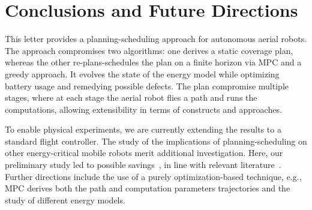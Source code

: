 \documentclass[letterpaper,10pt,journal,twoside]{IEEEtran}
\newcommand{\stt}[1]{{\small\tt #1}} %
\newcommand{\powprof}{\stt{powprofiler}}
\theoremstyle{definition}
\begin{document}



\vspace*{-1.5ex}
\section{Conclusions and Future Directions}  %
\label{sec:conclusion}                       %
This letter provides a planning-scheduling approach for autonomous aerial robots.%
The approach compromises two algorithms: one derives a static coverage plan, whereas the other re-plans-schedules the plan on a finite horizon via MPC {\color{blue} and a greedy approach}. It evolves the state of the energy model while optimizing battery usage and remedying possible defects. The plan compromise multiple stages, where at each stage the aerial robot flies a path and runs the computations, allowing %
extensibility in terms of constructs and approaches.

{\color{blue}To enable physical experiments}, we are currently extending the results to a standard flight controller. %
The study of the implications of planning-scheduling on other energy-critical mobile robots {\color{blue}merit additional investigation}. Here, our preliminary study led to possible savings~\cite{seewald2020beyond}, in line with relevant literature~\cite{ondruska2015scheduled,lahijanian2018resource}.
Further directions include {\color{blue}the use of a purely optimization-based technique, e.g., MPC derives both the path and computation parameters trajectories and} the study of different energy models.%
\end{document}
